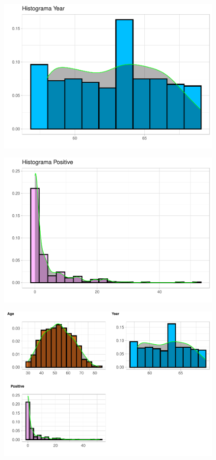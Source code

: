 \begin{figure}[H]\includegraphics[width=.9\linewidth]{img/EDA2_files/figure-latex/unnamed-chunk-10-2} \end{figure}

\begin{figure}[H]\includegraphics[width=.9\linewidth]{img/EDA2_files/figure-latex/unnamed-chunk-10-3} \end{figure}

\begin{figure}[H]\includegraphics[width=.9\linewidth]{img/EDA2_files/figure-latex/unnamed-chunk-10-4} \end{figure}

